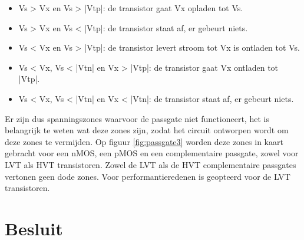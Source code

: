 \begin{itemize}
\item Vs > Vx en Vs > |Vtp|: de transistor gaat Vx opladen tot Vs.
\item Vs > Vx en Vs < |Vtp|: de transistor staat af, er gebeurt niets.
\item Vs < Vx en Vs > |Vtp|: de transistor levert stroom tot Vx is ontladen tot Vs.
\item Vs < Vx, Vs < |Vtn| en Vx > |Vtp|: de transistor gaat Vx ontladen tot |Vtp|.
\item Vs < Vx, Vs < |Vtn| en Vx < |Vtn|: de transistor staat af, er gebeurt niets.
\end{itemize}

Er zijn dus spanningszones waarvoor de passgate niet functioneert, het is belangrijk te weten wat deze zones zijn, zodat het circuit ontworpen wordt om deze zones te vermijden. 
Op figuur \ref{fig:passgate3} worden deze zones in kaart gebracht voor een nMOS, een pMOS en een complementaire passgate, zowel voor LVT als HVT transistoren.
Zowel de LVT als de HVT complementaire passgates vertonen geen dode zones. Voor performantieredenen is geopteerd voor de LVT transistoren.

\section{Besluit}


